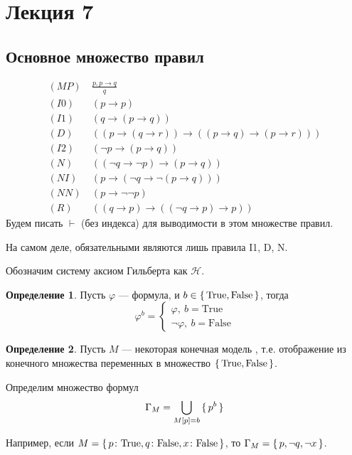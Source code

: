 \documentclass[12pt]{article}
\let\im\rightarrow
\let\n\neg
\theoremstyle{definition}
\newtheorem{definition}{Определение}[section]
\theoremstyle{plain}
\theoremstyle{remark}
\begin{document}
\pagebreak

\section{Лекция 7}

\subsection{Основное множество правил}

\begin{align*}
  (MP)\ &\frac{p, p \im q}{q}\\
  (I0)\ &(p \im p)\\
  (I1)\ &(q \im (p \im q))\\
  (D)\ &((p \im (q \im r)) \im ((p \im q) \im (p \im r)))\\
  (I2)\ &(\n p \im (p \im q))\\
  (N)\ &((\n q \im \n p) \im (p \im q))\\
  (NI)\ &(p \im (\n q \im \n (p \im q)))\\
  (NN)\ &(p \im \n\n p)\\
  (R)\ &((q \im p) \im ((\n q \im p) \im p))
\end{align*}
Будем писать $\vdash$ (без индекса) для выводимости в этом множестве правил.

На самом деле, обязательными являются лишь правила I1, D, N.

Обозначим систему аксиом Гильберта как $\mathcal{H}$.

\begin{definition}
  Пусть $\varphi$ --- формула, и $b \in \set{\mathrm{True},
  \mathrm{False}}$, тогда
  \[
    \varphi^b =
    \begin{cases}
      \varphi,\ b = \mathrm{True}\\
      \n \varphi,\ b = \mathrm{False}
    \end{cases}
  \]
\end{definition}

\begin{definition}
  Пусть $M$ --- некоторая конечная модель , т.е. отображение из
  конечного множества переменных в множество $\set{\mathrm{True},
  \mathrm{False}}$.

  Определим множество формул
  \[
    \Gamma_M = \bigcup_{M[p] = b} \set{p^b}
  \]
\end{definition}

Например, если $M = \set{p\colon \mathrm{True}, q\colon
\mathrm{False}, x\colon \mathrm{False}}$, то $\Gamma_M = \set{p, \n q, \n x}$.
\end{document}
